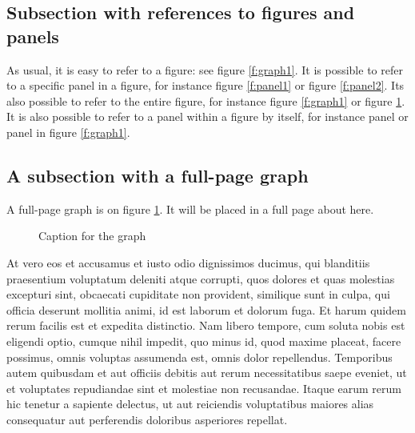 \documentclass[letterpaper,12pt,leqno]{article}
\newcommand{\pdf}{figures.pdf}
\begin{document}
\subsection{Subsection with references to figures and panels} 

As usual, it is easy to refer to a figure: see figure \ref{f:graph1}. It is possible to refer to a specific panel in a figure, for instance figure \ref{f:panel1} or figure \ref{f:panel2}. Its also possible to refer to the entire figure, for instance figure \ref{f:graph1} or figure \ref{f:graph2}. It is also possible to refer to a panel within a figure by itself, for instance panel  or panel  in figure \ref{f:graph1}.

\subsection{A subsection with a full-page graph}

A full-page graph is on figure \ref{f:graph2}. It will be placed in a full page about here.

\begin{figure}[p]
\hfill
{}\fspace
{}\hfill
{}\fspace
{}\hfill
{}
\caption{Caption for the graph}
\label{f:graph2}\end{figure}

At vero eos et accusamus et iusto odio dignissimos ducimus, qui blanditiis praesentium voluptatum deleniti atque corrupti, quos dolores et quas molestias excepturi sint, obcaecati cupiditate non provident, similique sunt in culpa, qui officia deserunt mollitia animi, id est laborum et dolorum fuga. Et harum quidem rerum facilis est et expedita distinctio. Nam libero tempore, cum soluta nobis est eligendi optio, cumque nihil impedit, quo minus id, quod maxime placeat, facere possimus, omnis voluptas assumenda est, omnis dolor repellendus. Temporibus autem quibusdam et aut officiis debitis aut rerum necessitatibus saepe eveniet, ut et voluptates repudiandae sint et molestiae non recusandae. Itaque earum rerum hic tenetur a sapiente delectus, ut aut reiciendis voluptatibus maiores alias consequatur aut perferendis doloribus asperiores repellat. 
\end{document}
